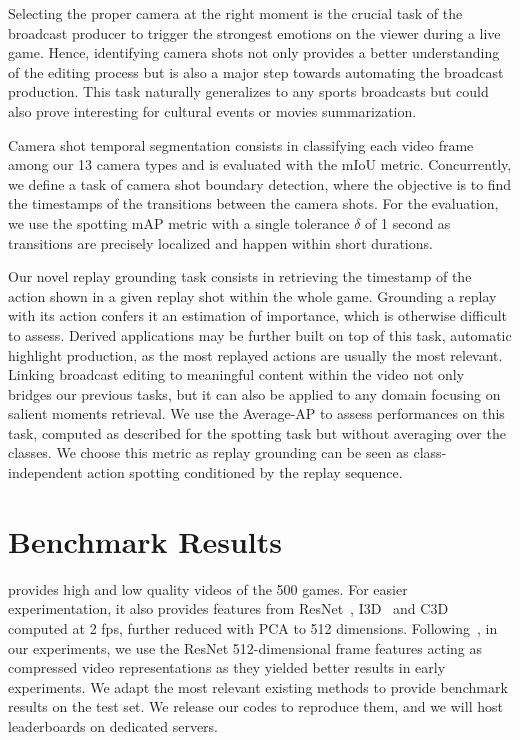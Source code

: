 \documentclass[final]{cvsports}
\begin{document}
\label{subsec-Camera shot segmentation and boundary detection}
Selecting the proper camera at the right moment is the crucial task of the broadcast producer to trigger the strongest emotions on the viewer during a live game. Hence, identifying camera shots not only provides a better understanding of the editing process but is also a major step towards automating the broadcast production. This task naturally generalizes to any sports broadcasts but could also prove interesting for \eg cultural events or movies summarization.


Camera shot temporal segmentation consists in classifying each video frame among our 13 camera types and is evaluated with the mIoU metric. Concurrently, we define a task of camera shot boundary detection, where the objective is to find the timestamps of the transitions between the camera shots. For the evaluation, we use the spotting mAP metric with a single tolerance $\delta$ of 1 second as transitions 
are precisely localized and happen within short durations.



Our novel replay grounding task consists in retrieving the timestamp of the action shown in a given replay shot within the whole game. 
Grounding a replay with its action confers it an estimation of importance, which is otherwise difficult to assess. Derived applications may be further built on top of this task, \eg automatic highlight production, as the most replayed actions are usually the most relevant. Linking broadcast editing to meaningful content within the video not only bridges our previous tasks, but it can also be applied to any domain focusing on salient moments retrieval. 
We use the Average-AP to assess performances on this task, computed as described for the spotting task but without averaging over the classes. 
We choose this metric as replay grounding can be seen as class-independent action spotting conditioned by the replay sequence. \section{Benchmark Results}
\label{sec:Exp}

 \SoccerNet provides high and low quality videos of the 500 games. 
For easier experimentation, it also provides features from ResNet~\cite{He_2016_CVPR}, I3D~\cite{carreira2017quo} and C3D~\cite{tran2015learning} computed at 2 fps, further reduced with PCA to 512 dimensions.
Following~\cite{cioppa2020context,Giancola_2018_CVPR_Workshops}, in our experiments, we use the ResNet 512-dimensional frame features acting as compressed video representations as they yielded better results in early experiments. We adapt the most relevant existing methods to provide benchmark results on the \SoccerNet test set. We release our codes to reproduce them,
and we will host leaderboards on dedicated servers. 
\end{document}
